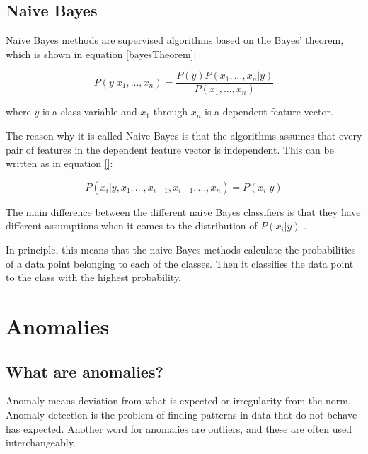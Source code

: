 \documentclass[english, a4paper]{report}
\begin{document}
{{        \subsection{Naive Bayes} \label{naiveBayesTheory}
        {
            Naive Bayes methods are supervised algorithms based on the Bayes' theorem, which is shown in equation \ref{bayesTheorem}:
            
            \begin{equation} \label{bayesTheorem}
                P(y|x_1,...,x_n) = \frac{P(y)P(x_1,...,x_n|y)}{P(x_1,...,x_n)}
            \end{equation}
            
            where \begin{math} y \end{math} is a class variable and \begin{math} x_1 \end{math} through \begin{math} x_n \end{math} is a dependent feature vector.
            \par 
            The reason why it is called Naive Bayes is that the algorithms assumes that every pair of features in the dependent feature vector is independent. This can be written as in equation \ref{}:
            
            \begin{equation}
                P(x_i|y,x_1,...,x_{i-1},x_{i+1},...,x_n) = P(x_i|y)
            \end{equation}
            
            The main difference between the different naive Bayes classifiers is that they have different assumptions when it comes to the distribution of \begin{math} P(x_i|y) \end{math} \cite{scikitNaiveBayes}.
            \par 
            In principle, this means that the naive Bayes methods calculate the probabilities of a data point belonging to each of the classes. Then it classifies the data point to the class with the highest probability. 
        }
    }
    
    \section{Anomalies} \label{anomaliesTheory}
    {
        \subsection{What are anomalies?} \label{whatAreAnomalies}
        {
            Anomaly means deviation from what is expected or irregularity from the norm. Anomaly detection is the problem of finding patterns in data that do not behave has expected. Another word for anomalies are outliers, and these are often used interchangeably. 
            \par
            
}}}
\end{document}
